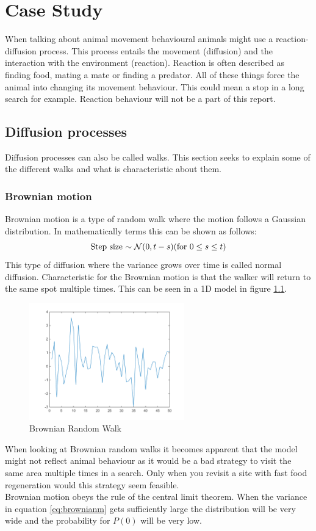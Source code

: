 \chapter{Case Study}
When talking about animal movement behavioural animals might use a reaction-diffusion process. This process entails the movement (diffusion) and the interaction with the environment (reaction). Reaction is often described as finding food, mating a mate or finding a predator. All of these things force the animal into changing its movement behaviour. This could mean a stop in a long search for example. Reaction behaviour will not be a part of this report.

\section{Diffusion processes}
Diffusion processes can also be called walks. This section seeks to explain some of the different walks and what is characteristic about them.

\subsection{Brownian motion}
Brownian motion is a type of random walk where the motion follows a Gaussian distribution. In mathematically terms this can be shown as follows:
\begin{equation}
$Step size $ \sim \mathcal{N}(0,t-s) ($for $ 0 \leq s \leq t)
\label{eq:brownianm}
\end{equation}
This type of diffusion where the variance grows over time is called normal diffusion. Characteristic for the Brownian motion is that the walker will return to the same spot multiple times. This can be seen in a 1D model in figure \ref{fig:brownianrw}.
\begin{figure}[H]
\centering
\includegraphics[width = 0.6\textwidth]{billeder/brownian}
\caption{Brownian Random Walk}
\label{fig:brownianrw}
\end{figure}
When looking at Brownian random walks it becomes apparent that the model might not reflect animal behaviour as it would be a bad strategy to visit the same area multiple times in a search. Only when you revisit a site with fast food regeneration would this strategy seem feasible.\\
Brownian motion obeys the rule of the central limit theorem. When the variance in equation \ref{eq:brownianm} gets sufficiently large the distribution will be very wide and the probability for $P(0)$ will be very low.

